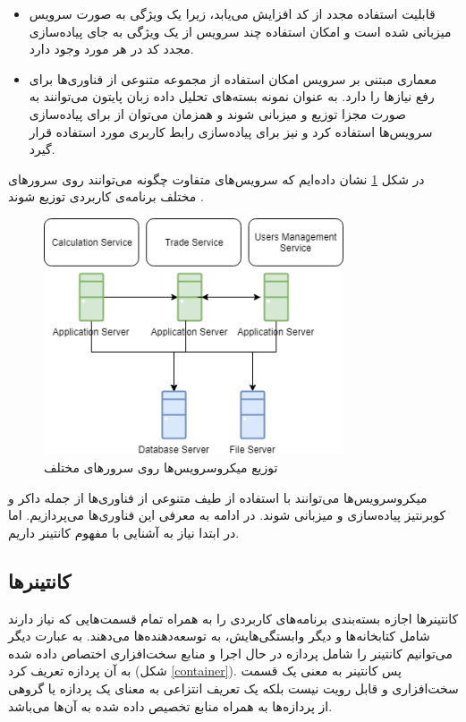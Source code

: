 \begin{itemize}
	\item قابلیت استفاده مجدد از کد افزایش می‌یابد، زیرا یک ویژگی به صورت سرویس میزبانی شده است و امکان استفاده چند سرویس از یک ویژگی به جای پیاده‌سازی مجدد کد در هر مورد وجود دارد.
	
	\item معماری مبتنی بر سرویس امکان استفاده از مجموعه متنوعی از فناوری‌ها برای رفع نیازها را دارد. به عنوان نمونه بسته‌های تحلیل داده زبان پایتون می‌توانند به صورت مجزا توزیع و میزبانی شوند و همزمان می‌توان از  برای پیاده‌سازی سرویس‌ها استفاده کرد و  نیز برای پیاده‌سازی رابط کاربری مورد استفاده قرار گیرد.
	
\end{itemize}

در شکل \ref{distribution-microservices} نشان داده‌ایم که سرویس‌های متفاوت چگونه می‌توانند روی سرورهای مختلف برنامه‌ی کاربردی توزیع شوند \cite{malik_2019}.

\begin{figure}[!h]
	\centering
	\includegraphics[height=7cm]{images/distribution-microservices}
	\caption{توزیع میکروسرویس‌ها روی سرورهای مختلف}
	\label{distribution-microservices}
\end{figure}

میکروسرویس‌ها می‌توانند با استفاده از طیف متنوعی از فناوری‌ها از جمله داکر و کوبرنتیز پیاده‌سازی و میزبانی شوند. در ادامه به معرفی این فناوری‌ها می‌پردازیم. اما در ابتدا نیاز به آشنایی با مفهوم کانتینر داریم.

\subsection{کانتینرها}

کانتینرها اجازه بسته‌بندی برنامه‌های کاربردی را به همراه تمام قسمت‌هایی که نیاز دارند شامل کتابخانه‌ها و دیگر وابستگی‌هایش، به توسعه‌دهنده‌ها می‌دهند. به عبارت دیگر می‌توانیم کانتینر را شامل پردازه در حال اجرا و منابع سخت‌افزاری اختصاص داده شده به آن پردازه تعریف کرد (شکل \ref{container}). پس کانتینر به معنی یک قسمت سخت‌افزاری و قابل رویت نیست بلکه یک تعریف انتزاعی به معنای یک پردازه یا گروهی از پردازه‌ها به همراه منابع تخصیص داده شده به آن‌ها می‌باشد. 

